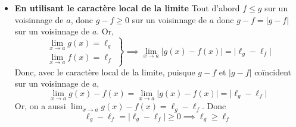 \documentclass{article}
\renewenvironment{question_kholle}[2][ ]
{
	\subsection{\texorpdfstring{#2}{}}
	\notblank{#1}
	{
		\noindent #1
		\bigbreak
	}
	{}
	\begin{proof}
}
{
	\end{proof}
}
\begin{document}
\begin{question_kholle}
\begin{itemize}[label=$\star$]
		\item \textbf{En utilisant le caractère local de la limite}
		      Tout d'abord $f \leqslant g$ sur un voisinnage de $a$, donc $g - f \geqslant 0$ sur un voisinnage de $a$ donc $g-f = \lvert g-f \rvert$ sur un voisinnage de $a$.
		      Or,
		      $$
			      \left. \begin{array}{ll}
				      \lim_{ x \to a }g(x) = \ell_{g} \\
				      \lim_{ x \to a } f(x) = \ell_{f}
			      \end{array}\right\}
			      \implies \lim_{ x \to a } \lvert g(x) - f(x) \rvert  = \lvert \ell_{g} - \ell _{f} \rvert
		      $$
		      Donc, avec le caractère local de la limite, puisque $g-f$ et $|g-f|$ coïncident sur un voisinnage de $a$,
		      $$
			      \lim_{ x \to a } g(x) - f(x) = \lim_{ x \to a } \lvert g(x) - f(x) \rvert  = \lvert \ell_{g} - \ell_{f} \rvert
		      $$
		      Or,  on a aussi $\lim_{ x \to a }g(x) - f(x) = \ell_{g} - \ell_{f}$.
		      Donc
		      $$
			      \ell_{g} - \ell_{f} = \lvert \ell_{g} - \ell_{f} \rvert \geqslant 0 \implies \ell_{g} \geqslant \ell_{f}
		      $$
	\end{itemize}
\end{question_kholle}
\end{document}
